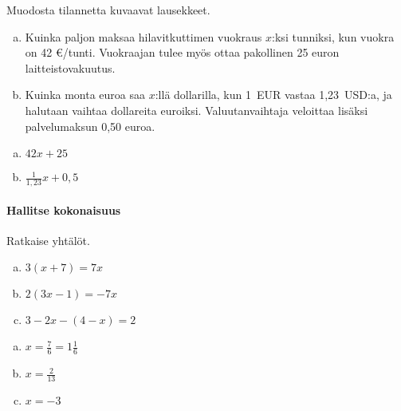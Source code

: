 \begin{tehtava}
    Muodosta tilannetta kuvaavat lausekkeet.
    \begin{enumerate}[(a)]
        \item Kuinka paljon maksaa hilavitkuttimen vuokraus $x$:ksi tunniksi, kun vuokra on 42 \euro /tunti. Vuokraajan tulee myös ottaa pakollinen 25 euron laitteistovakuutus.
        \item Kuinka monta euroa saa $x$:llä dollarilla, kun 1~EUR vastaa 1,23~USD:a, ja halutaan vaihtaa dollareita euroiksi. Valuutanvaihtaja veloittaa lisäksi palvelumaksun 0,50 euroa.
    \end{enumerate}
    \begin{vastaus}
        \begin{enumerate}[(a)]
            \item $42x + 25$
            \item $\frac{1}{1{,}23}x + 0{,}5$
        \end{enumerate}
    \end{vastaus}
\end{tehtava}



\paragraph*{Hallitse kokonaisuus}

\begin{tehtava}
    Ratkaise yhtälöt.
    \begin{enumerate}[(a)]
        \item $3(x+7)=7x$
        \item $2(3x-1)=-7x $
        \item $3-2x-(4-x)=2 $
    \end{enumerate}
    \begin{vastaus}
        \begin{enumerate}[(a)]
            \item $x = \frac{7}{6} =1\frac{1}{6} $
            \item $x = \frac{2}{13}$
            \item $x = -3$
        \end{enumerate}
    \end{vastaus}
\end{tehtava}


